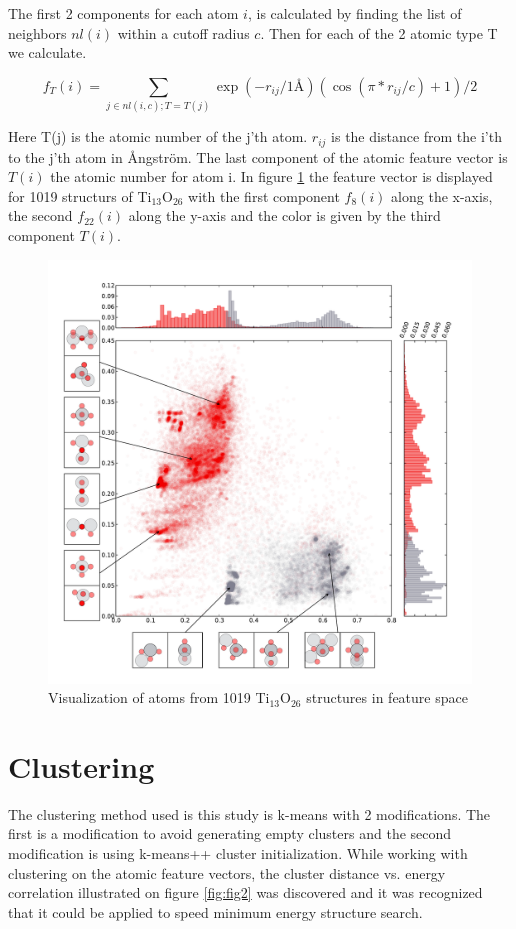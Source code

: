\documentclass[%
 aps,
 prl,%
 amsmath,amssymb,
 reprint,%
]{revtex4-1}
\begin{document}
The first 2 components for each atom $i$, is calculated by finding the list of neighbors $nl(i)$ within a cutoff radius $c$. Then for each of the 2 atomic type T we calculate. 

$$ f_T(i) = \sum_{j \in nl(i,c);T=T(j)} \exp(-r_{ij}/1\text{\AA})(\cos(\pi*r_{ij}/c)+1)/2 $$

Here T(j) is the atomic number of the j'th atom. $r_{ij}$ is the distance from the i'th to the j'th atom in {\AA}ngstr\"{o}m. The last component of the atomic feature vector is $T(i)$ the atomic number for atom i. 
In figure \ref{fig:fig1} the feature vector is displayed for 1019 structurs of Ti$_{13}$O$_{26}$ with the first component $f_8(i)$ along the x-axis, the second $f_{22}(i)$ along the y-axis and the color is given by the third component $T(i)$. 




\begin{figure}[h]
    \centering
    \includegraphics[width=1.0\columnwidth]{ascatter_1_Ti13O26Ridge_1510747669.pdf}
    \caption{Visualization of atoms from 1019 Ti$_{13}$O$_{26}$ structures in feature space}
    \label{fig:fig1}
\end{figure}


\section{Clustering}
The clustering method used is this study is k-means with 2 modifications. The first is a modification to avoid generating empty clusters \cite{Malay2009} and the second modification is using k-means++ cluster initialization. While working with clustering on the atomic feature vectors, the cluster distance vs. energy correlation illustrated on figure \ref{fig:fig2} was discovered and it was recognized that it could be applied to speed minimum energy structure search.   
\end{document}
